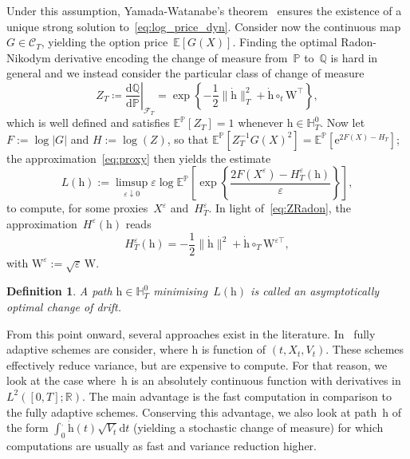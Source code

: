 \documentclass{amsart}[11pt]
\numberwithin{equation}{section}
\numberwithin{theorem}{subsection}
\numberwithin{proposition}{subsection}
\newtheorem{definition}{Definition}
\numberwithin{definition}{subsection}
\numberwithin{lemma}{subsection}
\numberwithin{assumption}{subsection}
\newcommand{\Cc}{\mathcal{C}}
\newcommand{\Ff}{\mathcal{F}}
\newcommand{\HH}{\mathbb{H}}
\newcommand{\PP}{\mathbb{P}}
\newcommand{\QQ}{\mathbb{Q}}
\newcommand{\RR}{\mathbb{R}}
\newcommand{\EE}{\mathbb{E}}
\newcommand{\ct}{\circ_{t}}
\newcommand{\Wf}{\boldsymbol{\mathrm{W}}}
\newcommand{\D}{\mathrm{d}}
\newcommand{\E}{\mathrm{e}}
\newcommand{\eps}{\varepsilon}
\newcommand{\hh}{\boldsymbol{\mathrm{h}}}
\begin{document}
Under this assumption,
Yamada-Watanabe's theorem~\cite[Theorem 1]{Yamada1971} ensures the existence of 
a unique strong solution to~\eqref{eq:log_price_dyn}.
Consider now the continuous map
$G\in\Cc_T$, 
yielding the option price~$\EE[G(X)]$.
Finding the optimal Radon-Nikodym derivative encoding the change of measure from~$\PP$ to~$\QQ$ is hard in general and we instead consider the particular class of change of measure
\begin{equation}\label{eq:ZRadon}
Z_T\coloneqq \left.\frac{\D \QQ}{\D \PP}\right\vert_{\Ff_T} = \exp\left\{-\frac{1}{2}\|\dot{\hh}\|_{T}^2 + \dot{\hh}\ct \Wf^\top \right\},
\end{equation}
which is well defined and satisfies $\EE^{\PP}[Z_T]=1$
whenever $\hh \in \HH^0_T$.
Now let $F := \log|G|$ and $H := \log(Z)$, so that
$\EE^{\PP}[Z_T^{-1} G(X)^2] = \EE^{\PP}[\E^{2F(X) - H_T}]$; 
the approximation~\eqref{eq:proxy} then yields the estimate
\begin{equation}\label{eq:MinProblem}
L(\hh):=\limsup_{\eps\downarrow 0}\eps\log\EE^{\PP}\left[\exp\left\{\frac{2F(X^\eps) - H_T^\eps(\hh)}{\eps}\right\}\right],
\end{equation}
to compute, for some proxies~$X^\eps$ and~$H_T^\eps$.
In light of~\eqref{eq:ZRadon}, the approximation~$H^\eps(\hh)$  reads
\begin{equation}\label{eq:ProxyHEps}
H^{\eps}_T(\hh) = -\frac{1}{2}\|\dot{\hh}\|^2 + \dot{\hh}\circ_T \Wf^{\eps\top},
\end{equation}
with $\Wf^\eps:=\sqrt{\eps}\,\Wf$.
\begin{definition}\label{def:asyoptdrift}
A path $\hh\in \HH_T^0$ 
minimising~$L(\hh)$
is called an asymptotically optimal change of drift.
\end{definition}

From this point onward, several approaches exist in the literature. In~\cite{Dupuis2012, Hartmann2015, Dupuis2017} fully adaptive schemes are consider, where $\hh$ is function of $(t, X_t, V_t)$. These schemes effectively reduce variance, but are expensive to compute. 
For that reason, we look at the case where~$\hh$ is an absolutely continuous function with derivatives in $L^2([0,T]; \RR)$.
The main advantage is the fast computation in comparison to the fully adaptive schemes. 
Conserving this advantage, we also look at path~$\hh$ of the form $\int_0^.\dot{\hh}(t)\sqrt{V_t}\D t$ (yielding a stochastic change of measure) for which computations are usually as fast and variance reduction higher. 
\end{document}

